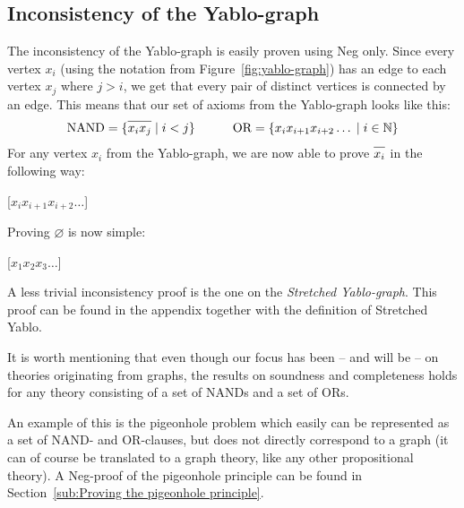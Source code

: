 \subsection{Inconsistency of the Yablo-graph}
\label{sub:Inconsistency of the Yablo-graph}
The inconsistency of the Yablo-graph is easily proven using Neg only.
Since every vertex $x_i$ (using the notation from Figure~\ref{fig:yablo-graph}) has an edge to each vertex $x_j$ where $j > i$, we get that every pair of distinct vertices is connected by an edge.
This means that our set of axioms from the Yablo-graph looks like this:
\begin{align}
  \text{NAND} = \{ \ol{x_ix_j} \; |\; i < j\}
  \quad\quad\quad
  \text{OR} = \{ x_ix_{i+1}x_{i+2}\dots \; |\; i \in \mathbb{N}\}
\end{align}
For any vertex $x_i$ from the Yablo-graph, we are now able to prove $\ol{x_i}$ in the following way:
\begin{prooftree*}
  \Hypo{\dots}
  [$x_ix_{i+1}x_{i+2}\dots$]{}
\end{prooftree*}
Proving $\varnothing$ is now simple:
\begin{prooftree*}
  \Hypo{\dots}
  \Hypo{\dots}
  \Hypo{\dots}
  \Hypo{\dots}
  [$x_1x_2x_3\dots$]{\varnothing}
\end{prooftree*}
A less trivial inconsistency proof is the one on the \textit{Stretched Yablo-graph}.
This proof can be found in the appendix together with the definition of Stretched Yablo.

It is worth mentioning that even though our focus has been -- and will be -- on theories originating from graphs, the results on soundness and completeness holds for any theory consisting of a set of NANDs and a set of ORs.

An example of this is the pigeonhole problem which easily can be represented as a set of NAND- and OR-clauses, but does not directly correspond to a graph (it can of course be translated to a graph theory, like any other propositional theory).
A Neg-proof of the pigeonhole principle can be found in Section~\ref{sub:Proving the pigeonhole principle}.
